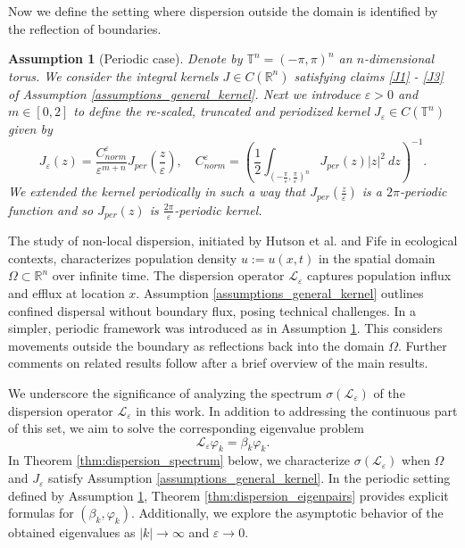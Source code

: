 \documentclass[12pt, a4paper]{article}
\theoremstyle{break}
\theoremstyle{break}
\newtheorem{asm}{Assumption}[section]
\theoremstyle{break}
\theoremstyle{break}
\theoremstyle{break}
\newcommand{\Leo}{\mathcal{L}_{\varepsilon}}
\begin{document}
Now we define the setting where dispersion outside the domain is identified by the reflection of boundaries.
\begin{asm}[Periodic case]
    Denote by $\mathbb{T}^n = (-\pi, \pi)^n$ an $n$-dimensional torus. We consider the integral kernels $J \in C(\mathbb{R}^n)$ satisfying claims \ref{J1} - \ref{J3} of Assumption \ref{assumptions_general_kernel}. Next we introduce $\varepsilon > 0$ and $m \in [0,2]$ to define the re-scaled, truncated and periodized kernel $J_\varepsilon \in C(\mathbb{T}^n)$ given by
    \begin{equation}
        J_\varepsilon(z) = \frac{C_{norm}^\varepsilon}{\varepsilon^{m+n}}J_{per}\left(\frac{z}{\varepsilon} \right), \quad C_{norm}^\varepsilon = \left(\frac{1}{2} \int_{\left( -\frac{\pi}{\varepsilon}, \frac{\pi}{\varepsilon} \right)^n} J_{per}(z)|z|^2\:dz\right)^{-1}.
    \end{equation}
    We extended the kernel periodically in such a way that $J_{per}\left(\frac{z}{\varepsilon}\right)$ is a $2\pi$-periodic function and so $J_{per}(z)$ is $\frac{2\pi}{\varepsilon}$-periodic kernel.
     \label{assumptions_periodic_kernel}
\end{asm}

The study of non-local dispersion, initiated by Hutson et al. \cite{Hutson2003, Hutson2005} and Fife \cite{Fife2001} in ecological contexts, characterizes population density $u := u(x,t)$ in the spatial domain $\Omega \subset \mathbb{R}^n$ over infinite time. The dispersion operator $\Leo$ captures population influx and efflux at location $x$. Assumption \ref{assumptions_general_kernel} outlines confined dispersal without boundary flux, posing technical challenges. In \cite{Hutson2003} a simpler, periodic framework was introduced as in Assumption \ref{assumptions_periodic_kernel}. This considers movements outside the boundary as reflections back into the domain $\Omega$. Further comments on related results follow after a brief overview of the main results.

\hspace{1pt}

We underscore the significance of analyzing the spectrum $\sigma(\Leo)$ of the dispersion operator $\Leo$ in this work. In addition to addressing the continuous part of this set, we aim to solve the corresponding eigenvalue problem
\begin{equation}
    \Leo \varphi_k = \beta_k \varphi_k.
    \label{eigenvalue_problem}
\end{equation}
In Theorem \ref{thm:dispersion_spectrum} below, we characterize $\sigma(\Leo)$ when $\Omega$ and $J_\varepsilon$ satisfy Assumption \ref{assumptions_general_kernel}. In the periodic setting defined by Assumption \ref{assumptions_periodic_kernel}, Theorem \ref{thm:dispersion_eigenpairs} provides explicit formulas for $(\beta_k, \varphi_k)$. Additionally, we explore the asymptotic behavior of the obtained eigenvalues as $|k| \rightarrow \infty$ and $\varepsilon \rightarrow 0$.
\end{document}
